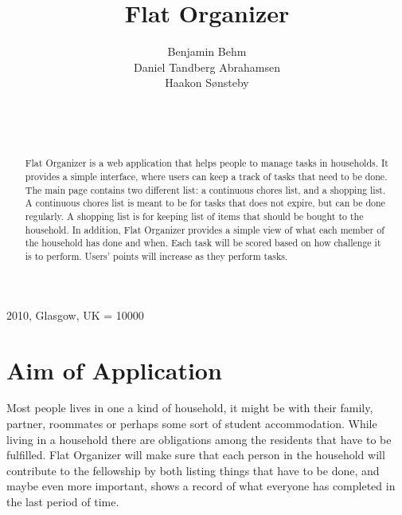 \documentclass{sig-alt-release2}
\begin{document}
\newcommand{\todo}[1]{\textcolor{red}{#1}}
\def\newblock{\hskip .11em plus .33em minus .07em}

 {2010, Glasgow, UK} 
\widowpenalty = 10000

\title{{Flat Organizer}}

\author{
\alignauthor
Benjamin Behm\\
Daniel Tandberg Abrahamsen\\
Haakon S{\o}nsteby\\
	   \\
      \\
      \\
}
\maketitle

\begin{abstract}
Flat Organizer is a web application that helps people to manage tasks in households. It provides a simple interface, where users can keep a track of tasks that need to be done. The main page contains two different list: a continuous chores list, and a shopping list. A continuous chores list is meant to be for tasks that does not expire, but can be done regularly. A shopping list is for keeping list of items that should be bought to the household. In addition, Flat Organizer provides a simple view of what each member of the household has done and when. Each task will be scored based on how challenge it is to perform. Users' points will increase as they perform tasks.

\end{abstract}

\section{Aim of Application}
Most people lives in one a kind of household, it might be with their family, partner, roommates or perhaps some sort of student accommodation. While living in a household there are obligations among the residents that have to be fulfilled. Flat Organizer will make sure that each person in the household will contribute to the fellowship by both listing things that have to be done, and maybe even more important, shows a record of what everyone has completed in the last period of time.
\end{document}
